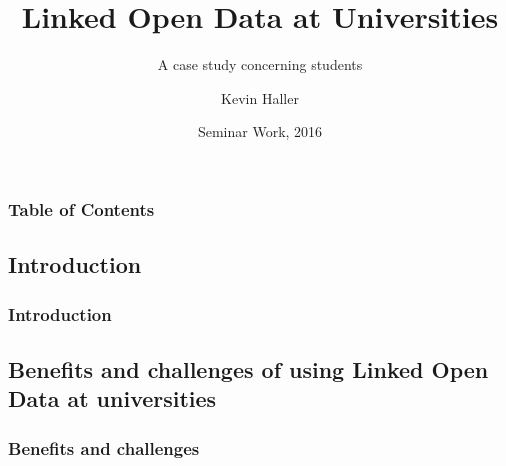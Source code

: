 \documentclass{beamer}
\begin{document}
\title[LOD] %
{Linked Open Data at Universities}
\subtitle{A case study concerning students}
\author[Author, Haller] %
{Kevin Haller}

\date[2016] %
{Seminar Work, 2016}
\subject{Computer Science}

\frame{\titlepage}

\begin{frame}
\frametitle{Table of Contents}
\tableofcontents[hideallsubsections]
\end{frame}


\begin{frame}
\section[Introduction]{Introduction}
\frametitle{Introduction}
\end{frame}


\begin{frame}
\section[Benefits and challenges]{Benefits and challenges of using Linked Open Data at universities}
\frametitle{Benefits and challenges}

\end{frame}
\end{document}
